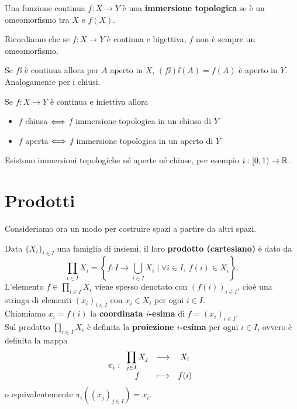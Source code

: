 \begin{multicols*}{2}
\begin{definition}
Una funzione continua $f:X\to Y$ è una \textbf{immersione topologica} se è un omeomorfismo tra $X$ e $f(X)$.
\end{definition}

\begin{remark}
Ricordiamo che se $f:X\to Y$ è continua e bigettiva, $f$ non è sempre un omeomorfismo.
\end{remark}
\begin{remark}
Se $f\ii$ è continua allora per $A$ aperto in $X$, $(f\ii)\ii(A)=f(A)$ è aperto in $Y$. Analogamente per i chiusi.
\end{remark}

\begin{proposition}\label{CaratterizzazioneImmersioniTopologicheInApertiOChiusi}
Se $f:X\to Y$ è continua e iniettiva allora
\begin{itemize}[noitemsep]
\item $f$ chiusa $\Longleftrightarrow$ $f$ immersione topologica in un chiuso di $Y$
\item $f$ aperta $\Longleftrightarrow$ $f$ immersione topologica in un aperto di $Y$
\end{itemize}
\end{proposition}
\begin{remark}
Esistono immersioni topologiche né aperte né chiuse, per esempio $i:[0,1)\to \mathbb{R}$.
\end{remark}


\section{Prodotti}
Consideriamo ora un modo per costruire spazi a partire da altri spazi.
\begin{definition}
Data $\{X_i\}_{i\in I}$ una famiglia di insiemi, il loro \textbf{prodotto (cartesiano)} è dato da
\[\prod_{i\in I}X_i=\left\{f:I\to\bigcup_{i\in I}X_i\mid \forall i\in I,\ f(i)\in X_i\right\}.\]
L'elemento $f\in \prod_{i\in I}X_i$ viene spesso denotato con $(f(i))_{i\in I}$, cioè una stringa di elementi $(x_i)_{i\in I}$ con $x_i\in X_i$ per ogni $i\in I$.\\
Chiamiamo $x_i=f(i)$ la \textbf{coordinata $i$-esima} di $f=(x_i)_{i\in I}$.\\
Sul prodotto $\prod_{i\in I}X_i$ è definita la \textbf{proiezione $i$-esima} per ogni $i\in I$, ovvero è definita la mappa
\[\pi_i:\begin{array}{ccc} {\displaystyle \prod_{j\in I}X_j} & \longrightarrow & {X_i}\\ {f} & \longmapsto & {f(i)} \end{array}\]
o equivalentemente $\pi_i((x_j)_{j\in I})=x_i$.
\end{definition}


\end{multicols*}
